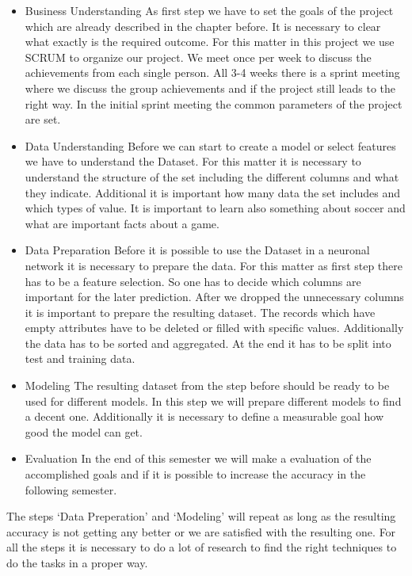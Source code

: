 \begin{itemize}
\item Business Understanding \newline
As first step we have to set the goals of the project which are already described in the chapter before. It is necessary to clear what exactly is the required outcome. For this matter in this project we use SCRUM to organize our project. We meet once per week to discuss the achievements from each single person. All 3-4 weeks there is a sprint meeting where we discuss the group achievements and if the project still leads to the right way. In the initial sprint meeting the common parameters of the project are set. 
\item Data Understanding \newline
Before we can start to create a model or select features we have to understand the Dataset. For this matter it is necessary to understand the structure of the set including the different columns and what they indicate. Additional it is important how many data the set includes and which types of value. It is important to learn also something about soccer and what are important facts about a game. 
\item Data Preparation \newline
 Before it is possible to use the Dataset in a neuronal network it is necessary to prepare the data. For this matter as first step there has to be a feature selection. So one has to decide which columns are important for the later prediction. After we dropped the unnecessary columns it is important to prepare the resulting dataset. The records which have empty attributes have to be deleted or filled with specific values. Additionally the data has to be sorted and aggregated. At the end it has to be split into test and training data. 
 \item Modeling \newline
 The resulting dataset from the step before should be ready to be used for different models. In this step we will prepare different models to find a decent one. Additionally it is necessary to define a measurable goal how good the model can get.   
\item Evaluation \newline
In the end of this semester we will make a evaluation of the accomplished goals and if it is possible to increase the accuracy in the following semester.  
\end{itemize}

The steps `Data Preperation' and `Modeling' will repeat as long as the resulting accuracy is not getting any better or we are satisfied with the resulting one. For all the steps it is necessary to do a lot of research to find the right techniques to do the tasks in a proper way. 